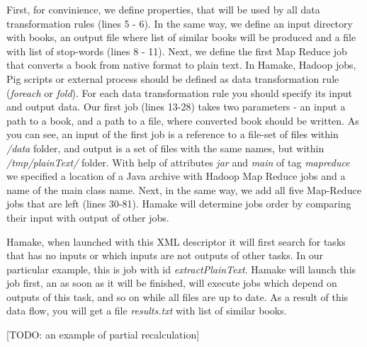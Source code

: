 \documentclass[11pt,twocolumn]{article}
\begin{document}
First, for convinience, we define properties, that will be used by all
data transformation rules (lines 5 - 6). In the same way, we define an
input directory with books, an output file where list of similar books
will be produced and a file with list of stop-words (lines 8 - 11).
Next, we define the first Map Reduce job that converts a book from
native format to plain text. In Hamake, Hadoop jobs, Pig scripts or
external process should be defined as data transformation rule
(\textit{foreach} or \textit{fold}). For each data transformation rule
you should specify its input and output data. Our first job (lines
13-28) takes two parameters - an input a path to a book, and a path to
a file, where converted book should be written.  As you can see, an
input of the first job is a reference to a file-set of files within
\textit{/data} folder, and output is a set of files with the same
names, but within \textit{/tmp/plainText/} folder. With help of
attributes \textit{jar} and \textit{main} of tag \textit{mapreduce} we
specified a location of a Java archive with Hadoop Map Reduce jobs and
a name of the main class name. Next, in the same way, we add all five
Map-Reduce jobs that are left (lines 30-81). Hamake will determine
jobs order by comparing their input with output of other jobs.



Hamake, when launched with this XML descriptor it will first search
for tasks that has no inputs or which inputs are not outputs of other
tasks. In our particular example, this is job with id
\textit{extractPlainText}. Hamake will launch this job first, an as
soon as it will be finished, will execute jobs which depend on outputs
of this task, and so on while all files are up to date. As a result of
this data flow, you will get a file \textit{results.txt} with list of
similar books.

[TODO: an example of partial recalculation]
\end{document}
